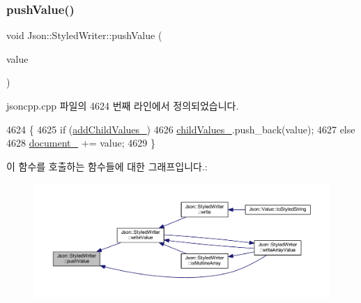 \mbox{\label{class_json_1_1_styled_writer_a236a833b4bdaa09915c2cac715970f08}} 
\subsubsection{\texorpdfstring{push\+Value()}{pushValue()}}
{\footnotesize\ttfamily void Json\+::\+Styled\+Writer\+::push\+Value (\begin{DoxyParamCaption}\item[{const \hyperlink{json_8h_a1e723f95759de062585bc4a8fd3fa4be}{J\+S\+O\+N\+C\+P\+P\+\_\+\+S\+T\+R\+I\+NG} \&}]{value }\end{DoxyParamCaption})\hspace{0.3cm}{\ttfamily [private]}}



jsoncpp.\+cpp 파일의 4624 번째 라인에서 정의되었습니다.


\begin{DoxyCode}
4624                                                         \{
4625   \textcolor{keywordflow}{if} (\hyperlink{class_json_1_1_styled_writer_acaabfa48b50a8bb7fa9ce98e2ae971d9}{addChildValues\_})
4626     \hyperlink{class_json_1_1_styled_writer_a1f905495f0705365af117ec541e29fdf}{childValues\_}.push\_back(value);
4627   \textcolor{keywordflow}{else}
4628     \hyperlink{class_json_1_1_styled_writer_ae967b0c77e4d7cb889ce7b6ee4ce28d7}{document\_} += value;
4629 \}
\end{DoxyCode}
이 함수를 호출하는 함수들에 대한 그래프입니다.\+:\nopagebreak
\begin{figure}[H]
\begin{center}
\leavevmode
\includegraphics[width=350pt]{class_json_1_1_styled_writer_a236a833b4bdaa09915c2cac715970f08_icgraph}
\end{center}
\end{figure}
\mbox{\label{class_json_1_1_styled_writer_acee1c9285519b573cfcb00b7e7f5a809}} 
